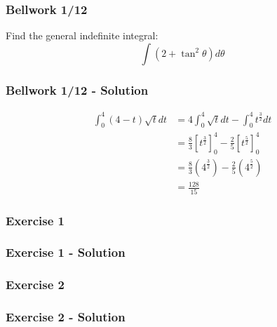 \documentclass[12pt]{beamer}
\begin{document}
\begin{frame}
	\frametitle{Bellwork 1/12}
	\initclock

	\vfill
	\vfill
	\vfill
	\Large
	Find the general indefinite integral:
	\vfill
	\[\int (2+\tan^2\theta)d\theta\]
	\vfill
	\vfill
	\vfill
	\vfill
	\vfill

	\small
	\crono
\end{frame}
\begin{frame} 
	\frametitle{Bellwork 1/12 - Solution}

	\large
	\begin{align*}
		\int_{0}^{4}(4-t)\sqrt{t}dt &= 4\int_{0}^{4}\sqrt{t}dt-\int_{0}^{4}t^\frac{3}{2}dt \\
		&= \frac{8}{3}\left[t^\frac{3}{2}\right]_0^4 - \frac{2}{5}\left[t^\frac{5}{2}\right]_0^4 \\
		&= \frac{8}{3}\left(4^\frac{3}{2}\right) - \frac{2}{5}\left(4^\frac{5}{2}\right) \\
		&= \boxed{\frac{128}{15}}
	\end{align*}
\end{frame}
\begin{frame}
	\frametitle{Exercise 1}

	
\end{frame}
\begin{frame}
	\frametitle{Exercise 1 - Solution}

	
\end{frame}
\begin{frame}
	\frametitle{Exercise 2}

	
\end{frame}
\begin{frame}
	\frametitle{Exercise 2 - Solution}

	
\end{frame}
\end{document}
